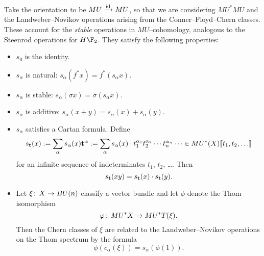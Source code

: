 \begin{definition}
Take the orientation to be $MU \xrightarrow{\mathrm{id}} MU$, so that we are considering $MU^* MU$ and the Landweber--Novikov operations arising from the Conner--Floyd--Chern classes.  These account for the \emph{stable} operations in $MU$--cohomology, analogous to the Steenrod operations for $H\F_2$.  They satisfy the following properties:
\begin{itemize}
\item $s_0$ is the identity.
\item $s_\alpha$ is natural: $s_\alpha(f^* x) = f^*(s_\alpha x)$.
\item $s_\alpha$ is stable: $s_\alpha(\sigma x) = \sigma(s_\alpha x)$.
\item $s_\alpha$ is additive: $s_\alpha(x + y) = s_\alpha(x) + s_\alpha(y)$.
\item $s_\alpha$ satisfies a Cartan formula.  Define \[s_{\mathbf t}(x) := \sum_{\alpha} s_\alpha(x) \mathbf t^\alpha := \sum_\alpha s_\alpha(x) \cdot t_1^{\alpha_1} t_2^{\alpha_2} \cdots t_n^{\alpha_n} \cdots \in MU^*(X)\llbracket{t_1, t_2, \ldots}\rrbracket\] for an infinite sequence of indeterminates $t_1$, $t_2$, \ldots.  Then \[s_{\mathbf t}(x y) = s_{\mathbf t}(x) \cdot s_{\mathbf t}(y).\]
\item Let $\xi\colon\thinspace X \to BU(n)$ classify a vector bundle and let $\phi$ denote the Thom isomorphism \[\varphi\colon\thinspace MU^* X \to MU^* T(\xi).\]  Then the Chern classes of $\xi$ are related to the Landweber--Novikov operations on the Thom spectrum by the formula \[\phi(c_\alpha(\xi)) = s_\alpha(\phi(1)).\]
\end{itemize}
\end{definition}

